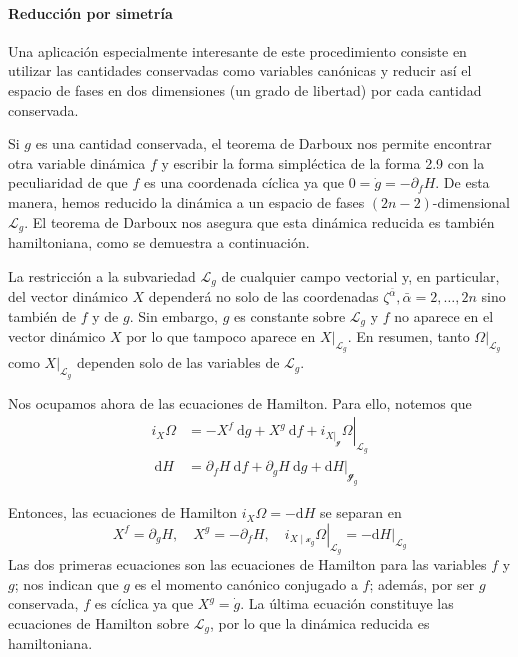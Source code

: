 \paragraph{Reducción por simetría}
Una aplicación especialmente interesante de este procedimiento consiste en utilizar las cantidades conservadas como variables canónicas y reducir así el espacio de fases en dos dimensiones (un grado de libertad) por cada cantidad conservada.

Si $g$ es una cantidad conservada, el teorema de Darboux nos permite encontrar otra variable dinámica $f$ y escribir la forma simpléctica de la forma 2.9 con
la peculiaridad de que $f$ es una coordenada cíclica ya que $0=\dot{g}=-\partial_{f} H$. De esta manera, hemos reducido la dinámica a un espacio de fases $(2 n-2)$-dimensional $\mathscr{L}_{g}$. El teorema de Darboux nos asegura que esta dinámica reducida es también hamiltoniana, como se demuestra a continuación.

La restricción a la subvariedad $\mathscr{L}_{g}$ de cualquier campo vectorial y, en particular, del vector dinámico $X$ dependerá no solo de las coordenadas $\zeta^{\bar{\alpha}}, \bar{\alpha}=2, \ldots, 2 n$ sino también de $f$ y de $g$. Sin embargo, $g$ es constante sobre $\mathscr{L}_{g}$ y $f$ no aparece en el vector dinámico $X$ por lo que tampoco aparece en $\left.X\right|_{\mathscr{L}_{g}}$. En resumen, tanto $\left.\Omega\right|_{\mathscr{L}_{g}}$ como $\left.X\right|_{\mathscr{L}_{g}}$ dependen solo de las variables de $\mathscr{L}_{g}$.

Nos ocupamos ahora de las ecuaciones de Hamilton. Para ello, notemos que
$$
\begin{aligned}
i_{X} \Omega & =-X^{f} \mathrm{~d} g+X^{g} \mathrm{~d} f+\left.i_{\left.X\right|_{\mathscr{g}}} \Omega\right|_{\mathscr{L}_{g}} \\
\mathrm{~d} H & =\partial_{f} H \mathrm{~d} f+\partial_{g} H \mathrm{~d} g+\left.\mathrm{d} H\right|_{\mathscr{g}_{g}}
\end{aligned}
$$

Entonces, las ecuaciones de Hamilton $i_{X} \Omega=-\mathrm{d} H$ se separan en
$$
X^f=\partial_g H, \quad X^g=-\partial_f H,\left.\quad i_{X \mid \mathscr{x}_g} \Omega\right|_{\mathscr{L}_g}=-\left.\mathrm{d} H\right|_{\mathscr{L}_g}
$$
Las dos primeras ecuaciones son las ecuaciones de Hamilton para las variables $f$ y $g$; nos indican que $g$ es el momento canónico conjugado a $f$; además, por ser $g$ conservada, $f$ es cíclica ya que $X^{g}=\dot{g}$. La última ecuación constituye las ecuaciones de Hamilton sobre $\mathscr{L}_{g}$, por lo que la dinámica reducida es hamiltoniana.

